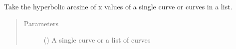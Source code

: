 \documentclass[letterpaper,10pt,english]{sphinxmanual}
\begin{document}
\begin{fulllineitems}
\label{\detokenize{pydv:pydvpy.asinhx}}
Take the hyperbolic arcsine of x values of a single curve or curves in a list.

\begin{sphinxVerbatim}[commandchars=\\\{\}]
  
\end{sphinxVerbatim}

\begin{sphinxVerbatim}[commandchars=\\\{\}]
\end{sphinxVerbatim}
\begin{quote}\begin{description}
\item[{Parameters}] \leavevmode
{} () \textendash{} A single curve or a list of curves

\end{description}\end{quote}

\end{fulllineitems}

\end{document}
